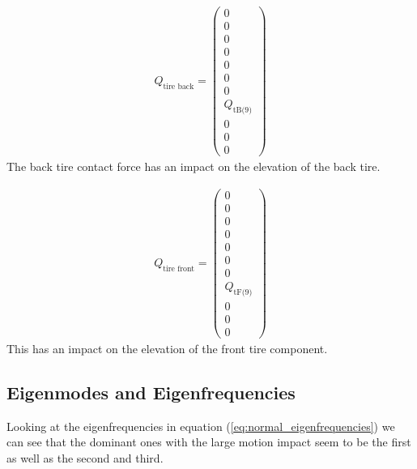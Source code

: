 \begin{equation}
    \begin{split}
        Q_\text{tire back} = \begin{pmatrix}
            0\\
            0\\
            0\\
            0\\
            0\\
            0\\
            0\\
            Q_\text{tB(9)}\\
            0\\
            0\\
            0
        \end{pmatrix}
    \end{split}
\end{equation}
The back tire contact force has an impact on the elevation of the back tire.

\begin{equation}
    \begin{split}
        Q_\text{tire front} = \begin{pmatrix}
            0\\
            0\\
            0\\
            0\\
            0\\
            0\\
            0\\
            Q_\text{tF(9)}\\
            0\\
            0\\
            0
        \end{pmatrix}
    \end{split}
\end{equation}
This has an impact on the elevation of the front tire component.
\subsubsection{}
\subsection{Eigenmodes and Eigenfrequencies}

Looking at the eigenfrequencies in equation (\ref{eq:normal_eigenfrequencies}) we can see that the dominant ones with the large motion impact seem to be the first as well as the second and third.

